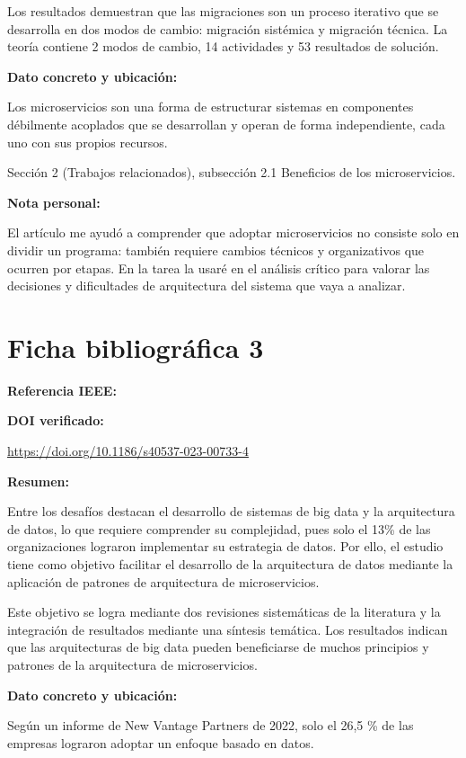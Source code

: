 \documentclass[12pt]{article}
\begin{document}
Los resultados demuestran que las migraciones son un proceso iterativo que se desarrolla en dos modos de cambio: migración sistémica y migración técnica. La teoría contiene 2 modos de cambio, 14 actividades y 53 resultados de solución.

\textbf{Dato concreto y ubicación:}

Los microservicios son una forma de estructurar sistemas en componentes débilmente acoplados que se desarrollan y operan de forma independiente, cada uno con sus propios recursos.

Sección 2 (Trabajos relacionados), subsección 2.1 Beneficios de los microservicios.

\textbf{Nota personal:}

El artículo me ayudó a comprender que adoptar microservicios no consiste solo en dividir un programa: también requiere cambios técnicos y organizativos que ocurren por etapas. En la tarea la usaré en el análisis crítico para valorar las decisiones y dificultades de arquitectura del sistema que vaya a analizar.

\clearpage
\section*{Ficha bibliográfica 3}

\textbf{Referencia IEEE:}


\textbf{DOI verificado:}

\url{https://doi.org/10.1186/s40537-023-00733-4}

\textbf{Resumen:}

Entre los desafíos destacan el desarrollo de sistemas de big data y la arquitectura de datos, lo que requiere comprender su complejidad, pues solo el 13\% de las organizaciones lograron implementar su estrategia de datos. Por ello, el estudio tiene como objetivo facilitar el desarrollo de la arquitectura de datos mediante la aplicación de patrones de arquitectura de microservicios. 

Este objetivo se logra mediante dos revisiones sistemáticas de la literatura y la integración de resultados mediante una síntesis temática. Los resultados indican que las arquitecturas de big data pueden beneficiarse de muchos principios y patrones de la arquitectura de microservicios.

\textbf{Dato concreto y ubicación:}

Según un informe de New Vantage Partners de 2022, solo el 26,5 \% de las empresas lograron adoptar un enfoque basado en datos.
\end{document}
